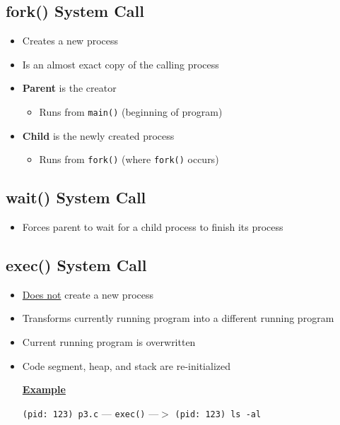 \documentclass[12pt]{article}
\begin{document}
\subsection{fork() System Call}
\begin{itemize}
    \item Creates a new process
    \item Is an almost exact copy of the calling process
    \item \textbf{Parent} is the creator
    \begin{itemize}
        \item Runs from \texttt{main()} (beginning of program)
    \end{itemize}
    \item \textbf{Child} is the newly created process
    \begin{itemize}
        \item Runs from \texttt{fork()} (where \texttt{fork()} occurs)
    \end{itemize}
\end{itemize}

\subsection{wait() System Call}
\begin{itemize}
    \item Forces parent to wait for a child process to finish its process
\end{itemize}

\subsection{exec() System Call}
\begin{itemize}
    \item \underline{Does not} create a new process
    \item Transforms currently running program into a different running program
    \item Current running program is overwritten
    \item Code segment, heap, and stack are re-initialized

    \bigskip

    \underline{\textbf{Example}}

    \bigskip

    \texttt{(pid: 123) p3.c} --- \texttt{exec()} ---$>$ \texttt{(pid: 123) ls -al}

\end{itemize}
\end{document}
